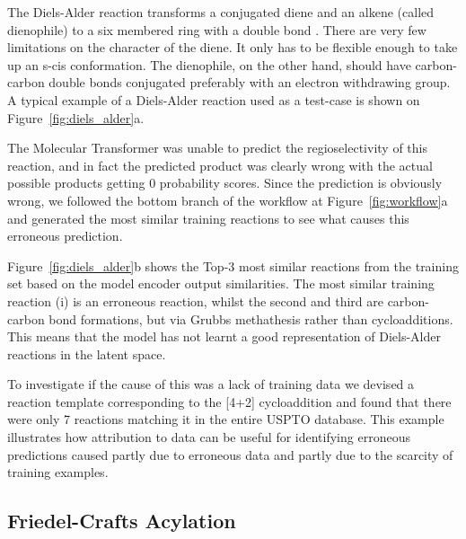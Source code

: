 The Diels-Alder reaction transforms a conjugated diene and an alkene (called dienophile) to a six membered ring with a double bond \cite{Clayden2012}. There are very few limitations on the character of the diene. It only has to be flexible enough to take up an s-cis conformation. The dienophile, on the other hand, should have carbon-carbon double bonds conjugated preferably with an electron withdrawing group. A typical example of a Diels-Alder reaction used as a test-case is shown on Figure~\ref{fig:diels_alder}a. 

The Molecular Transformer was unable to predict the regioselectivity of this reaction, and in fact the predicted product was clearly wrong with the actual possible products getting 0 probability scores. Since the prediction is obviously wrong, we followed the bottom branch of the workflow at Figure~\ref{fig:workflow}a and generated the most similar training reactions to see what causes this erroneous prediction.

Figure~\ref{fig:diels_alder}b shows the Top-3 most similar reactions from the training set based on the model encoder output similarities. The most similar training reaction (i) is an erroneous reaction, whilst the second and third are carbon-carbon bond formations, but via Grubbs methathesis \cite{grubbs} rather than cycloadditions. This means that the model has not learnt a good representation of Diels-Alder reactions in the latent space. 

To investigate if the cause of this was a lack of training data we devised a reaction template corresponding to the [4+2] cycloaddition and found that there were only 7 reactions matching it in the entire USPTO database. This example illustrates how attribution to data can be useful for identifying erroneous predictions caused partly due to erroneous data and partly due to the scarcity of training examples. 

\subsection{Friedel-Crafts Acylation}

